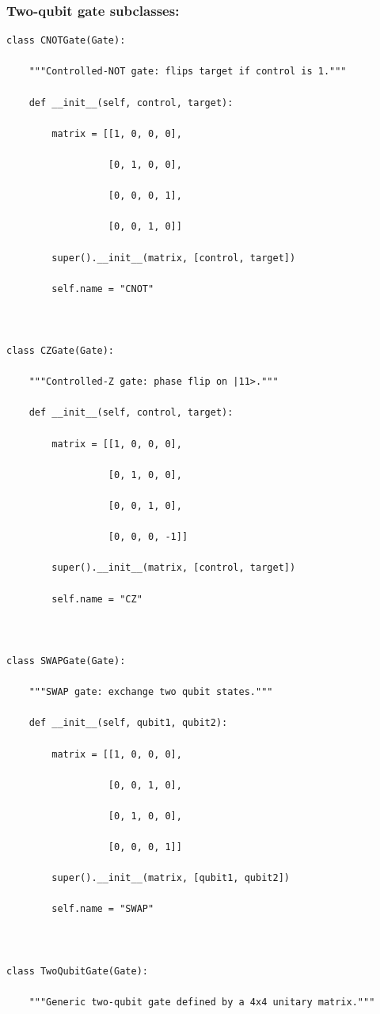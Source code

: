 \documentclass{beamer}
\begin{document}
\begin{frame}
\frametitle{Two-qubit gate subclasses:}

\begin{verbatim}
class CNOTGate(Gate):

    """Controlled-NOT gate: flips target if control is 1."""

    def __init__(self, control, target):

        matrix = [[1, 0, 0, 0],

                  [0, 1, 0, 0],

                  [0, 0, 0, 1],

                  [0, 0, 1, 0]]

        super().__init__(matrix, [control, target])

        self.name = "CNOT"



class CZGate(Gate):

    """Controlled-Z gate: phase flip on |11>."""

    def __init__(self, control, target):

        matrix = [[1, 0, 0, 0],

                  [0, 1, 0, 0],

                  [0, 0, 1, 0],

                  [0, 0, 0, -1]]

        super().__init__(matrix, [control, target])

        self.name = "CZ"



class SWAPGate(Gate):

    """SWAP gate: exchange two qubit states."""

    def __init__(self, qubit1, qubit2):

        matrix = [[1, 0, 0, 0],

                  [0, 0, 1, 0],

                  [0, 1, 0, 0],

                  [0, 0, 0, 1]]

        super().__init__(matrix, [qubit1, qubit2])

        self.name = "SWAP"



class TwoQubitGate(Gate):

    """Generic two-qubit gate defined by a 4x4 unitary matrix."""


\end{verbatim}
\end{frame}
\end{document}

